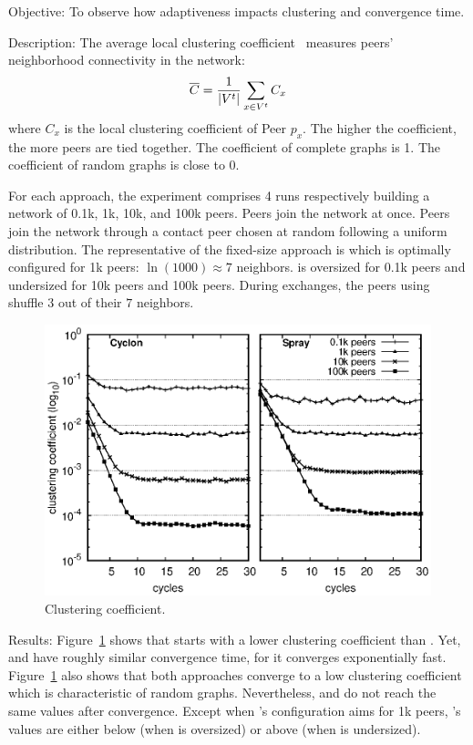 \begin{asparadesc}
\item[Objective:] To observe how adaptiveness impacts clustering and convergence
  time.
\item[Description:] The average local clustering
  coefficient~\cite{watts1998collective} measures peers' neighborhood
  connectivity in the network:
  \begin{equation*}
    \overline{C} = {1\over |V^t|}\sum\limits_{x\in V^t}C_x
  \end{equation*}
  where $C_x$ is the local clustering coefficient of Peer $p_x$. The higher the
  coefficient, the more peers are tied together. The coefficient of complete
  graphs is 1. The coefficient of random graphs is close to 0.  

  For each approach, the experiment comprises 4 runs respectively building a
  network of 0.1k, 1k, 10k, and 100k peers. Peers join the network at
  once. Peers join the network through a contact peer chosen at random following
  a uniform distribution. The representative of the fixed-size approach is
  \CYCLON which is optimally configured for 1k peers: $\ln(1000)\approx 7$
  neighbors.  \CYCLON is oversized for 0.1k peers and undersized for 10k peers
  and 100k peers. During exchanges, the peers using \CYCLON shuffle $3$ out of
  their $7$ neighbors.

\begin{figure}
  \centering
  \includegraphics[width=\SCALE\textwidth]{img/clustering.eps}
  \caption{\label{fig:clustering}Clustering coefficient.}
\end{figure}

\item[Results:] Figure~\ref{fig:clustering} shows that \CYCLON starts with a
  lower clustering coefficient than \SPRAY.  Yet, \CYCLON and \SPRAY have
  roughly similar convergence time, for it converges exponentially fast.
  Figure~\ref{fig:clustering} also shows that both approaches converge to a low
  clustering coefficient which is characteristic of random graphs. Nevertheless,
  \CYCLON and \SPRAY do not reach the same values after convergence. Except when
  \CYCLON's configuration aims for 1k peers, \SPRAY's values are either below
  (when \CYCLON is oversized) or above (when \CYCLON is undersized).
  

\end{asparadesc}
